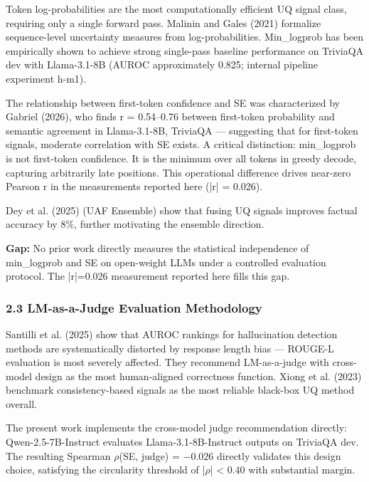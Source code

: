 Token log-probabilities are the most computationally efficient UQ signal class, requiring only a single forward pass. Malinin and Gales (2021) formalize sequence-level uncertainty measures from log-probabilities. Min\_logprob has been empirically shown to achieve strong single-pass baseline performance on TriviaQA dev with Llama-3.1-8B (AUROC approximately 0.825; internal pipeline experiment h-m1).

The relationship between first-token confidence and SE was characterized by Gabriel (2026), who finds r = 0.54--0.76 between first-token probability and semantic agreement in Llama-3.1-8B, TriviaQA --- suggesting that for first-token signals, moderate correlation with SE exists. A critical distinction: min\_logprob is not first-token confidence. It is the minimum over all tokens in greedy decode, capturing arbitrarily late positions. This operational difference drives near-zero Pearson r in the measurements reported here (|r| = 0.026).

Dey et al. (2025) (UAF Ensemble) show that fusing UQ signals improves factual accuracy by 8\%, further motivating the ensemble direction.

\textbf{Gap:} No prior work directly measures the statistical independence of min\_logprob and SE on open-weight LLMs under a controlled evaluation protocol. The |r|=0.026 measurement reported here fills this gap.

\subsubsection{2.3 LM-as-a-Judge Evaluation Methodology}

Santilli et al. (2025) show that AUROC rankings for hallucination detection methods are systematically distorted by response length bias --- ROUGE-L evaluation is most severely affected. They recommend LM-as-a-judge with cross-model design as the most human-aligned correctness function. Xiong et al. (2023) benchmark consistency-based signals as the most reliable black-box UQ method overall.

The present work implements the cross-model judge recommendation directly: Qwen-2.5-7B-Instruct evaluates Llama-3.1-8B-Instruct outputs on TriviaQA dev. The resulting Spearman $\rho$(SE, judge) = $-0.026$ directly validates this design choice, satisfying the circularity threshold of |$\rho$| < 0.40 with substantial margin.

